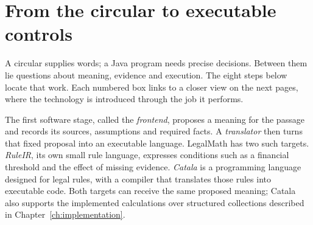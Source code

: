 \documentclass[12pt,a4paper,oneside,openany]{book}
\begin{document}
\chapter*{From the circular to executable controls}
\label{map:overview}
\begingroup
{}
\newcommand{\MapSubheading}[1]{\par\vspace{2mm}{\sffamily\bfseries\large #1\par}\vspace{1mm}}
\newcommand{\MapHeading}[2]{\phantomsection\label{#2}\MapSubheading{#1}}
\newenvironment{MapDiagram}{\par\noindent\begin{minipage}{\linewidth}\centering}{\par\end{minipage}\par}
\newcommand{\MapCaption}[1]{\par{\small\itshape #1\par}\vspace{2mm}}

A circular supplies words; a Java program needs precise decisions. Between
them lie questions about meaning, evidence and execution. The eight steps
below locate that work. Each numbered box links to a closer view on the next
pages, where the technology is introduced through the job it performs.

The first software stage, called the \emph{frontend}, proposes a meaning for the
passage and records its sources, assumptions and required facts. A
\emph{translator} then turns that fixed proposal into an executable language.
LegalMath has two such targets. \emph{RuleIR}, its own small rule language,
expresses conditions such as a financial threshold and the effect of missing
evidence. \emph{Catala} is a programming language designed for legal rules,
with a compiler that translates those rules into executable code. Both targets
can receive the same proposed meaning; Catala also supports the implemented
calculations over structured collections described in Chapter~\ref{ch:implementation}.
\end{document}
